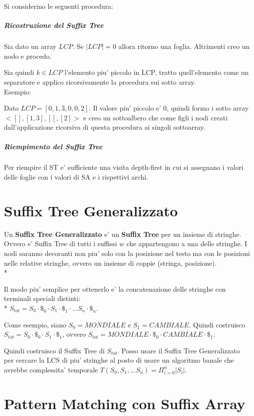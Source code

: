 Si considerino le seguenti procedura:

\subparagraph{Ricostruzione del Suffix Tree}

Sia dato un array $LCP$.
Se $|LCP| = 0$ allora ritorno una foglia.
Altrimenti creo un nodo e procedo.

Sia quindi $k \in LCP$ l'elemento piu' piccolo in LCP, tratto quell'elemento come un separatore e applico ricorsivamente la procedura sui sotto array. \\

Esempio:

Dato $LCP = [0, 1, 3, 0, 0, 2]$. Il valore piu' piccolo e' $0$, quindi formo i sotto array $<[], [1,3], [], [2]>$ e creo un sottoalbero che come figli i nodi creati dall'applicazione ricorsiva di questa procedura ai singoli sottoarray.

\subparagraph{Riempimento del Suffix Tree}

Per riempire il ST e' sufficiente una visita depth-first in cui si assegnano i valori delle foglie con i valori di SA e i rispettivi archi.

\section{Suffix Tree Generalizzato}

Un \textbf{Suffix Tree Generalizzato} e' un \textbf{Suffix Tree} per un insieme di stringhe.
Ovvero e' Suffix Tree di tutti i suffissi $w$ che appartengono a una delle stringhe.
I nodi saranno decoranti non piu' solo con la posizione nel testo ma con le posizioni nelle relative stringhe, ovvero un insieme di coppie (stringa, posizione). \\*

Il modo piu' semplice per ottenerlo e' la concatenazione delle stringhe con terminali speciali distinti: \\*
$S_{tot} = S_0 \cdot \$_0 \cdot S_1 \cdot \$_1 \cdot ... S_n \cdot \$_n$.

Come esempio, siano $S_0 = MONDIALE$ e $S_1 = CAMBIALE$.
Quindi costruisco $S_{tot} = S_0 \cdot \$_0 \cdot S_1 \cdot \$_1$, ovvero $S_{tot} = MONDIALE \cdot \$_0 \cdot CAMBIALE \cdot \$_1$.

Quindi costruisco il Suffix Tree di $S_{tot}$.
Posso usare il Suffix Tree Generalizzato per cercare la LCS di piu' stringhe al posto di usare un algoritmo banale che avrebbe complessita' temporale $T(S_0,S_1, ... S_n) = \Pi _ {i=0} ^ {n} |S_i|$.

\section{Pattern Matching con Suffix Array}

